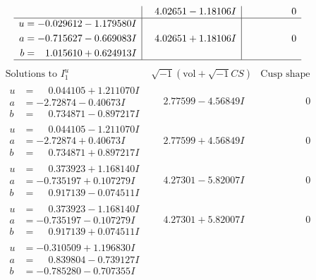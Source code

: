 \documentclass[1p]{elsarticle_modified}
\theoremstyle{definition}
\newcommand{\I}{\sqrt{-1}}
\begin{document}
$$\begin{array}{c|c|c}
 & \phantom{-}4.02651 - 1.18106 I & \phantom{-0.000000 } 0 \\ \hline\begin{aligned}
u &= -0.029612 - 1.179580 I \\
a &= -0.715627 - 0.669083 I \\
b &= \phantom{-}1.015610 + 0.624913 I\end{aligned}
 & \phantom{-}4.02651 + 1.18106 I & \phantom{-0.000000 } 0\\
 \hline 
 \end{array}$$\newpage$$\begin{array}{c|c|c}  
\text{Solutions to }I^u_{1}& \I (\text{vol} + \sqrt{-1}CS) & \text{Cusp shape}\\
 \hline 
\begin{aligned}
u &= \phantom{-}0.044105 + 1.211070 I \\
a &= -2.72874 - 0.40673 I \\
b &= \phantom{-}0.734871 - 0.897217 I\end{aligned}
 & \phantom{-}2.77599 - 4.56849 I & \phantom{-0.000000 } 0 \\ \hline\begin{aligned}
u &= \phantom{-}0.044105 - 1.211070 I \\
a &= -2.72874 + 0.40673 I \\
b &= \phantom{-}0.734871 + 0.897217 I\end{aligned}
 & \phantom{-}2.77599 + 4.56849 I & \phantom{-0.000000 } 0 \\ \hline\begin{aligned}
u &= \phantom{-}0.373923 + 1.168140 I \\
a &= -0.735197 + 0.107279 I \\
b &= \phantom{-}0.917139 - 0.074511 I\end{aligned}
 & \phantom{-}4.27301 - 5.82007 I & \phantom{-0.000000 } 0 \\ \hline\begin{aligned}
u &= \phantom{-}0.373923 - 1.168140 I \\
a &= -0.735197 - 0.107279 I \\
b &= \phantom{-}0.917139 + 0.074511 I\end{aligned}
 & \phantom{-}4.27301 + 5.82007 I & \phantom{-0.000000 } 0 \\ \hline\begin{aligned}
u &= -0.310509 + 1.196830 I \\
a &= \phantom{-}0.839804 - 0.739127 I \\
b &= -0.785280 - 0.707355 I\end{aligned}

\end{array}$$
\end{document}
